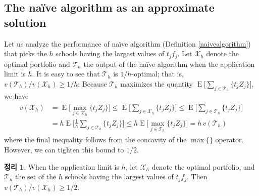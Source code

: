 \documentclass[12pt]{article} %
\newtheorem{theorem}{Theorem}
\theoremstyle{definition}
\newtheorem{theorem}{정리}
\theoremstyle{definition}
\begin{document}
\subsection{The na\"ive algorithm as an approximate solution}
Let us analyze the performance of na\"ive algorithm (Definition \ref{naivealgorithm}) that picks the $h$ schools having the largest values of $t_j f_j$. Let $\mathcal{X}_h$ denote the optimal portfolio and $\mathcal{T}_h$ the output of the na\"ive algorithm when the application limit is $h$. It is easy to see that $\mathcal{T}_h$ is $1/h$-optimal; that is, $v(\mathcal{T}_h) / v(\mathcal{X}_h) \geq 1/h$: Because $\mathcal{T}_h$ maximizes the quantity $\operatorname{E}\bigl[ \sum_{j \in \mathcal{T}_h}\{ t_j Z_j \}\bigr]$, we have
\begin{align}
\begin{split}
v(\mathcal{X}_h) &= \operatorname{E}\bigl[ \max_{j \in \mathcal{X}_h}\{ t_j Z_j \}\bigr] \leq \operatorname{E}\bigl[ \sum_{j \in \mathcal{X}_h}\{ t_j Z_j \}\bigr] \leq \operatorname{E}\bigl[ \sum_{j \in \mathcal{T}_h}\{ t_j Z_j \}\bigr] \\
&= h  \operatorname{E}\bigl[ \tfrac{1}{h} \sum_{j \in \mathcal{T}_h}\{ t_j Z_j \}\bigr]
\leq h  \operatorname{E}\bigl[ \max_{j \in \mathcal{T}_h}\{ t_j Z_j \}\bigr]
= h\,v(\mathcal{T}_h)
\end{split}
\end{align}
where the final inequality follows from the concavity of the $\max\{\}$ operator.  However, we can tighten this bound to $1/2$. 

\begin{theorem}
When the application limit is $h$, let $\mathcal{X}_h$ denote the optimal portfolio, and $\mathcal{T}_h$ the set of the $h$ schools having the largest values of $t_j f_j$. Then $v(\mathcal{T}_h) / v(\mathcal{X}_h) \geq 1/2$. 
\end{theorem}
\end{document}
